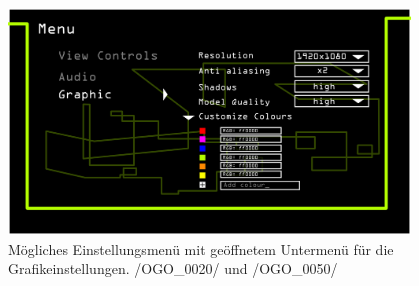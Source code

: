 	\begin{figure}[ht]
	  \centering
	  \includegraphics[width = 0.95\textwidth]{Inhalt/Nutzung/Grafiken/Grafische_Oberflaechen/08_Knot3-menu-graphics.png}
	  \caption{Mögliches Einstellungsmenü mit geöffnetem Untermenü für die Grafikeinstellungen. /OGO\_0020/ und /OGO\_0050/}
	\end{figure}

